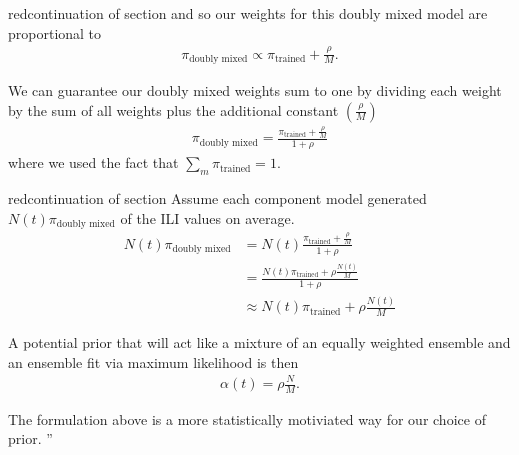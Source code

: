 \documentclass[
  fontsize=11pt,
  paper=a4,
  parskip=half,
  enlargefirstpage=on,    %
  fromalign=right,        %
  fromphone=on,           %
  fromrule=aftername,     %
  addrfield=on,           %
  backaddress=on,         %
  subject=beforeopening,  %
  locfield=narrow,        %
  foldmarks=on,           %
]{scrlttr2}
\newcommand{\f}{\frac}
\begin{document}
\begin{commt}{red}{continuation of section}
and so our weights for this doubly mixed model are proportional to 
\begin{align}
  \pi_{\text{doubly mixed}} \propto \pi_{\text{trained}} + \f{\rho}{M}. \tag{24}\label{eq:24}
\end{align}

We can guarantee our doubly mixed weights sum to one by dividing each weight by the sum of all weights plus the additional constant $(\f{\rho}{M})$
\begin{align}
  \pi_{\text{doubly mixed}}  =  \f{\pi_{\text{trained}} + \f{\rho}{M}}{1 + \rho} \tag{25}\label{eq:25}
\end{align}
where we used the fact that $\sum_{m} \pi_{\text{trained}} = 1$.
\end{commt}

\begin{commt}{red}{continuation of section}
Assume each component model generated $N(t) \pi_{\text{doubly mixed}}$ of the ILI values on average.
\begin{align}
  N(t) \pi_{\text{doubly mixed}}  &=  N(t) \f{\pi_{\text{trained}} + \f{\rho}{M}}{1 + \rho} \nonumber \\ 
                               &= \f{ N(t)\pi_{\text{trained}} + \rho \f{ N(t)}{M}}{1 + \rho} \nonumber \\
                               & \approx  N(t)\pi_{\text{trained}} + \rho \f{ N(t)}{M} \tag{26}\label{eq:26}
\end{align}

A potential prior that will act like a mixture of an equally weighted ensemble and an ensemble fit via maximum likelihood is then
\begin{align*}
  \alpha(t) = \rho \f{N}{M}.
\end{align*}

The formulation above is a more statistically motiviated way for our choice of prior.
      ''      
    \end{commt}
\end{document}
